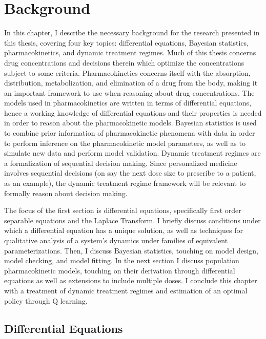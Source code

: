 \chapter{Background}

In this chapter, I describe the necessary background for the research presented in this thesis, covering four key topics: differential equations, Bayesian statistics, pharmacokinetics, and dynamic treatment regimes.  Much of this thesis concerns drug concentrations and decisions therein which optimize the concentrations subject to some criteria.  Pharmacokinetics concerns itself with the absorption, distribution, metabolization, and elimination of a drug from the body, making it an important framework to use when reasoning about drug concentrations. The models used in pharmacokinetics are written in terms of differential equations, hence a working knowledge of differential equations and their properties is needed in order to reason about the pharmacokinetic models.  Bayesian statistics is used to combine prior information of pharmacokinetic phenomena with data in order to perform inference on the pharmacokinetic model parameters, as well as to simulate new data and perform model validation.  Dynamic treatment regimes are a formalization of sequential decision making. Since personalized medicine involves sequential decisions (on say the next dose size to prescribe to a patient, as an example), the dynamic treatment regime framework will be relevant to formally reason about decision making.

The focus of the first section is differential equations, specifically first order separable equations and the Laplace Transform.  I briefly discuss conditions under which a differential equation has a unique solution, as well as techniques for qualitative analysis of a system's dynamics under families of equivalent parameterizations.  Then, I discuss Bayesian statistics, touching on model design, model checking, and model fitting.  In the next section I discuss population pharmacokinetic models, touching on their derivation through differential equations as well as extensions to include multiple doses.  I conclude this chapter with a treatment of dynamic treatment regimes and estimation of an optimal policy through Q learning.

\section{Differential Equations}\label{sec:ODE}


